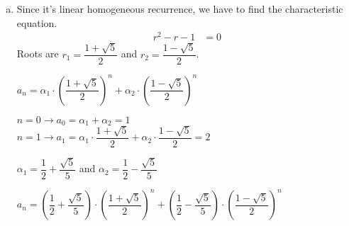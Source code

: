 \documentclass[12pt]{article}
\begin{document}
    \begin{enumerate}[a)]
        \item Since it's linear homogeneous recurrence, we have to find the characteristic equation.
            \begin{align*}
                r^2 - r - 1 &= 0
            \end{align*}
            Roots are $r_1 = \dfrac{1 + \sqrt{5}}{2}$ and $r_2 = \dfrac{1 - \sqrt{5}}{2}$.
            
            \begin{center}
                $a_n = \alpha_1 \cdot (\dfrac{1 + \sqrt{5}}{2})^n + \alpha_2 \cdot (\dfrac{1 - \sqrt{5}}{2})^n$
            
                $n = 0 \rightarrow a_0 = \alpha_1 + \alpha_2 = 1$ \\
                $n = 1 \rightarrow a_1 = \alpha_1 \cdot \dfrac{1 + \sqrt{5}}{2} + \alpha_2 \cdot \dfrac{1 - \sqrt{5}}{2}= 2$
            \end{center}{}
            
            \begin{center}
                $\alpha_1 = \dfrac{1}{2} + \dfrac{\sqrt{5}}{5}$ and $\alpha_2 = \dfrac{1}{2} - \dfrac{\sqrt{5}}{5}$
                
                $a_n = (\dfrac{1}{2} + \dfrac{\sqrt{5}}{5}) \cdot (\dfrac{1 + \sqrt{5}}{2})^n + (\dfrac{1}{2} - \dfrac{\sqrt{5}}{5}) \cdot (\dfrac{1 - \sqrt{5}}{2})^n$
            \end{center}{}
            

\end{enumerate}
\end{document}
